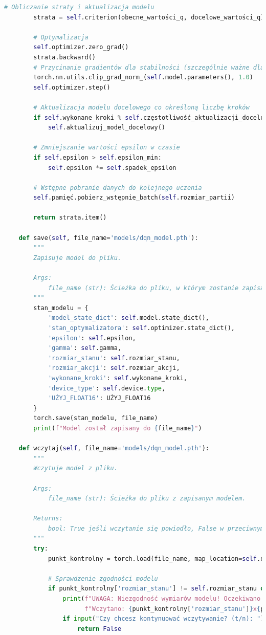 \documentclass[a4paper,12pt]{article}
\begin{document}
\begin{lstlisting}[language=Python]
        # Obliczanie straty i aktualizacja modelu
        strata = self.criterion(obecne_wartości_q, docelowe_wartości_q)
        
        # Optymalizacja
        self.optimizer.zero_grad()
        strata.backward()
        # Przycinanie gradientów dla stabilności (szczególnie ważne dla GPU)
        torch.nn.utils.clip_grad_norm_(self.model.parameters(), 1.0)
        self.optimizer.step()
        
        # Aktualizacja modelu docelowego co określoną liczbę kroków
        if self.wykonane_kroki % self.częstotliwość_aktualizacji_docelowej == 0:
            self.aktualizuj_model_docelowy()
            
        # Zmniejszanie wartości epsilon w czasie
        if self.epsilon > self.epsilon_min:
            self.epsilon *= self.spadek_epsilon
        
        # Wstępne pobranie danych do kolejnego uczenia
        self.pamięć.pobierz_wstępnie_batch(self.rozmiar_partii)
        
        return strata.item()
    
    def save(self, file_name='models/dqn_model.pth'):
        """
        Zapisuje model do pliku.
        
        Args:
            file_name (str): Ścieżka do pliku, w którym zostanie zapisany model.
        """
        stan_modelu = {
            'model_state_dict': self.model.state_dict(),
            'stan_optymalizatora': self.optimizer.state_dict(),
            'epsilon': self.epsilon,
            'gamma': self.gamma,
            'rozmiar_stanu': self.rozmiar_stanu,
            'rozmiar_akcji': self.rozmiar_akcji,
            'wykonane_kroki': self.wykonane_kroki,
            'device_type': self.device.type,
            'UŻYJ_FLOAT16': UŻYJ_FLOAT16
        }
        torch.save(stan_modelu, file_name)
        print(f"Model został zapisany do {file_name}")

    def wczytaj(self, file_name='models/dqn_model.pth'):
        """
        Wczytuje model z pliku.
        
        Args:
            file_name (str): Ścieżka do pliku z zapisanym modelem.
            
        Returns:
            bool: True jeśli wczytanie się powiodło, False w przeciwnym razie.
        """
        try:
            punkt_kontrolny = torch.load(file_name, map_location=self.device)
            
            # Sprawdzenie zgodności modelu
            if punkt_kontrolny['rozmiar_stanu'] != self.rozmiar_stanu or punkt_kontrolny['rozmiar_akcji'] != self.rozmiar_akcji:
                print(f"UWAGA: Niezgodność wymiarów modelu! Oczekiwano: {self.rozmiar_stanu}x{self.rozmiar_akcji}, "
                      f"Wczytano: {punkt_kontrolny['rozmiar_stanu']}x{punkt_kontrolny['rozmiar_akcji']}")
                if input("Czy chcesz kontynuować wczytywanie? (t/n): ").lower() != 't':
                    return False
            

\end{lstlisting}
\end{document}
